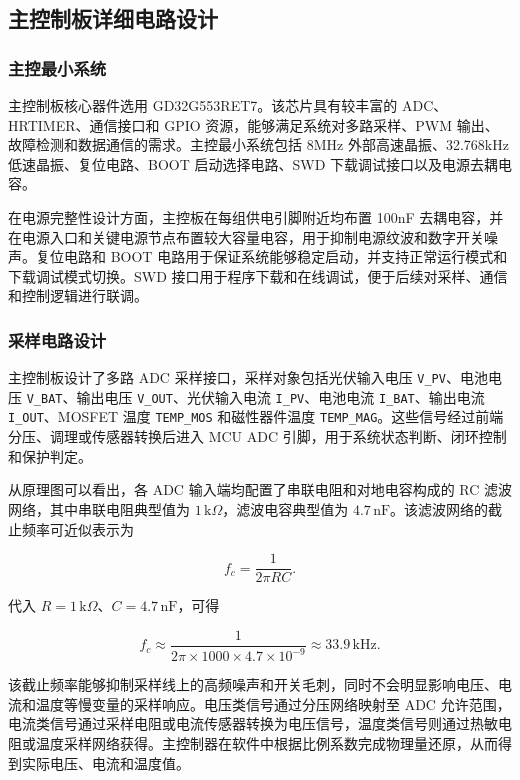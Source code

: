 \subsection{主控制板详细电路设计}

\subsubsection{主控最小系统}

主控制板核心器件选用 GD32G553RET7。该芯片具有较丰富的 ADC、HRTIMER、通信接口和 GPIO 资源，能够满足系统对多路采样、PWM 输出、故障检测和数据通信的需求。主控最小系统包括 8MHz 外部高速晶振、32.768kHz 低速晶振、复位电路、BOOT 启动选择电路、SWD 下载调试接口以及电源去耦电容。

在电源完整性设计方面，主控板在每组供电引脚附近均布置 100nF 去耦电容，并在电源入口和关键电源节点布置较大容量电容，用于抑制电源纹波和数字开关噪声。复位电路和 BOOT 电路用于保证系统能够稳定启动，并支持正常运行模式和下载调试模式切换。SWD 接口用于程序下载和在线调试，便于后续对采样、通信和控制逻辑进行联调。

\subsubsection{采样电路设计}

主控制板设计了多路 ADC 采样接口，采样对象包括光伏输入电压 \texttt{V\_PV}、电池电压 \texttt{V\_BAT}、输出电压 \texttt{V\_OUT}、光伏输入电流 \texttt{I\_PV}、电池电流 \texttt{I\_BAT}、输出电流 \texttt{I\_OUT}、MOSFET 温度 \texttt{TEMP\_MOS} 和磁性器件温度 \texttt{TEMP\_MAG}。这些信号经过前端分压、调理或传感器转换后进入 MCU ADC 引脚，用于系统状态判断、闭环控制和保护判定。

从原理图可以看出，各 ADC 输入端均配置了串联电阻和对地电容构成的 RC 滤波网络，其中串联电阻典型值为 $1\,\mathrm{k}\Omega$，滤波电容典型值为 $4.7\,\mathrm{nF}$。该滤波网络的截止频率可近似表示为

\[
f_c=\frac{1}{2\pi RC}.
\]

代入 $R=1\,\mathrm{k}\Omega$、$C=4.7\,\mathrm{nF}$，可得

\[
f_c\approx \frac{1}{2\pi\times1000\times4.7\times10^{-9}}
\approx 33.9\,\mathrm{kHz}.
\]

该截止频率能够抑制采样线上的高频噪声和开关毛刺，同时不会明显影响电压、电流和温度等慢变量的采样响应。电压类信号通过分压网络映射至 ADC 允许范围，电流类信号通过采样电阻或电流传感器转换为电压信号，温度类信号则通过热敏电阻或温度采样网络获得。主控制器在软件中根据比例系数完成物理量还原，从而得到实际电压、电流和温度值。

